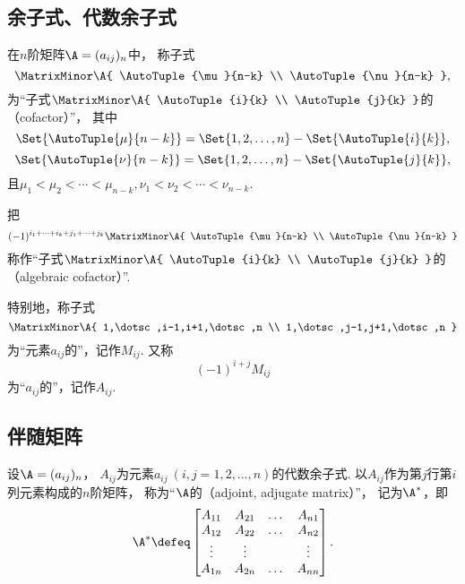 \subsection{余子式、代数余子式}
\begin{definition}
在\(n\)阶矩阵\(\A=(a_{ij})_n\)中，
称子式\[
	\MatrixMinor\A{
		\AutoTuple{\mu}{n-k} \\
		\AutoTuple{\nu}{n-k}
	},
\]为“子式\(\MatrixMinor\A{
	\AutoTuple{i}{k} \\
	\AutoTuple{j}{k}
}\)的（cofactor）”，
其中\[
	\Set{ \AutoTuple{\mu}{n-k} } = \Set{ 1,2,\dotsc,n } - \Set{ \AutoTuple{i}{k} },
\]\[
	\Set{ \AutoTuple{\nu}{n-k} } = \Set{ 1,2,\dotsc,n } - \Set{ \AutoTuple{j}{k} },
\]
且\(\mu_1<\mu_2<\dotsb<\mu_{n-k},
\nu_1<\nu_2<\dotsb<\nu_{n-k}\).

把\[
	(-1)^{i_1+\dotsb+i_k+j_1+\dotsb+j_k}
	\MatrixMinor\A{
		\AutoTuple{\mu}{n-k} \\
		\AutoTuple{\nu}{n-k}
	}
\]称作“子式\(\MatrixMinor\A{
	\AutoTuple{i}{k} \\
	\AutoTuple{j}{k}
}\)的（algebraic cofactor）”.

特别地，称子式\[
	\MatrixMinor\A{
		1,\dotsc,i-1,i+1,\dotsc,n \\
		1,\dotsc,j-1,j+1,\dotsc,n
	}
\]为“元素\(a_{ij}\)的”，记作\(M_{ij}\).
又称\[
(-1)^{i+j} M_{ij}
\]为“\(a_{ij}\)的”，记作\(A_{ij}\).
\end{definition}

\subsection{伴随矩阵}
\begin{definition}\label{definition:伴随矩阵.伴随矩阵的定义}
设\(\A=(a_{ij})_n\)，
\(A_{ij}\)为元素\(a_{ij}\ (i,j=1,2,\dotsc,n)\)的代数余子式.
以\(A_{ij}\)作为第\(j\)行第\(i\)列元素构成的\(n\)阶矩阵，
称为“\(\A\)的（adjoint, adjugate matrix）”，
记为\(\A^*\)，即\[
	\A^*
	\defeq
	\begin{bmatrix}
		A_{11} & A_{21} & \dots & A_{n1} \\
		A_{12} & A_{22} & \dots & A_{n2} \\
		\vdots & \vdots & & \vdots \\
		A_{1n} & A_{2n} & \dots & A_{nn}
	\end{bmatrix}.
\]
\end{definition}

